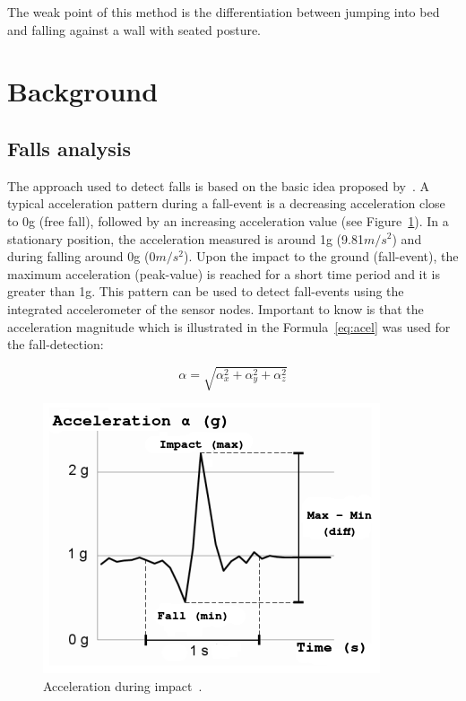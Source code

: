 \documentclass[review]{elsarticle}
\begin{document}
The weak point of this method is the differentiation between jumping into bed and falling against a wall with seated posture.

\section{Background}
\label{sec:background}

\subsection{Falls analysis}
\label{subsec:analysis}

The approach used to detect falls is based on the basic idea proposed by~\cite{Gjoreski2014,Kozina}. A typical acceleration pattern during 
a fall-event is a decreasing acceleration close to 0g (free fall), followed by an increasing acceleration value (see Figure~\ref{fig:grafica}). In a stationary position, 
the acceleration measured is around 1g (9.81$m/s^{2}$) and during falling around 0g (0$m/s^{2}$). Upon the impact to the ground (fall-event), 
the maximum acceleration (peak-value) is reached for a short time period and it is greater than 1g. This pattern can be used to 
detect fall-events using the integrated accelerometer of the sensor nodes. Important to know is that the acceleration 
magnitude which is illustrated in the Formula~\ref{eq:acel} was used for the fall-detection:

\begin{equation}\label{eq:acel}
 \alpha = \sqrt{\alpha_{x}^{2} + \alpha_{y}^{2} + \alpha_{z}^{2}}
\end{equation}

\begin{figure}[!ht]
  \centering
  \includegraphics[scale=0.6]{img/FallGraph}
  \caption[Acceleration during impact]{Acceleration during impact~\cite{Kozina}.}
  \label{fig:grafica}
\end{figure}
\end{document}

